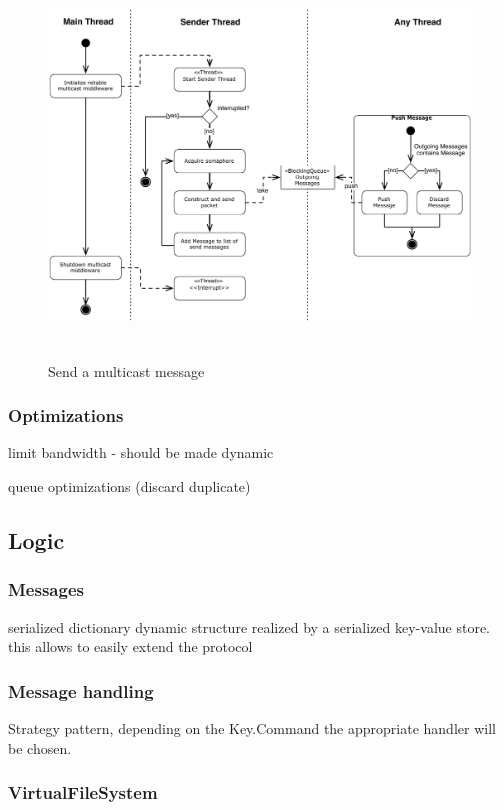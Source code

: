 \begin{figure}[htbp]
    \centering
        \includegraphics[height=4in]{figures/sendMessage.pdf}
    \caption{Send a multicast message}
    \label{fig:figures_processMessages}
\end{figure}

\subsubsection{Optimizations}

limit bandwidth 
    - should be made dynamic
    
queue optimizations (discard duplicate)

\subsection{Logic}

    
    \subsubsection{Messages}
    serialized dictionary
    dynamic structure realized by a serialized key-value store. 
    this allows to easily extend the protocol


    \subsubsection{Message handling}
    Strategy pattern, depending on the Key.Command the appropriate handler will be chosen.
    
    \subsubsection{VirtualFileSystem}
    
